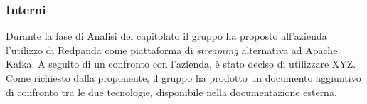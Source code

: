 \subsubsection{Interni}
Durante la fase di Analisi del capitolato il gruppo ha proposto all'azienda
l'utilizzo di Redpanda come piattaforma di \textit{streaming} alternativa ad Apache Kafka.
A seguito di un confronto con l'azienda, è stato deciso di utilizzare XYZ.\\ %
Come richiesto dalla proponente, il gruppo ha prodotto un documento aggiuntivo di
confronto tra le due tecnologie, disponibile nella documentazione esterna. %





